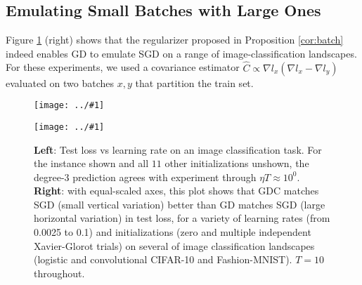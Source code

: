 \documentclass{article}
\theoremstyle{plain}
\theoremstyle{definition}
\newcommand{\plotmoo}[3]{
    \texttt{[image: ../\#1]}
}
\begin{document}
    \subsection{Emulating Small Batches with Large Ones}
        Figure \ref{fig:vanillaandbatch} (right) shows that the regularizer
        proposed in Proposition \ref{cor:batch} indeed enables GD to emulate
        SGD on a range of image-classification landscapes.  For these
        experiments,
        we used a covariance
        estimator $\hat C \propto \nabla l_x (\nabla l_x - \nabla l_y)$ evaluated on
        two batches $x, y$ that partition the train set.
        \begin{figure}[h!] 
            \centering
            \plotmoo{plots/test-vanilla-fashion}{0.48\columnwidth}{3.0cm} 
            \plotmoo{plots/big-bm-new}{0.48\columnwidth}{4.0cm}
            \caption{
                {\bf Left}: Test loss vs learning rate on an image
                classification task.  For the instance shown and all $11$ other
                initializations unshown, the degree-$3$ prediction agrees with
                experiment through $\eta T \approx 10^0$.
                {\bf Right}: with equal-scaled axes, this plot shows that GDC
                matches SGD (small vertical variation) better than GD matches
                SGD (large horizontal variation) in test loss, for a variety of
                learning rates (from 0.0025 to 0.1) and initializations (zero
                and multiple independent Xavier-Glorot trials) on several of
                image classification landscapes (logistic and convolutional
                CIFAR-10 and Fashion-MNIST).  $T=10$ throughout.
            }
            \label{fig:vanillaandbatch}
        \end{figure}
  
\end{document}
